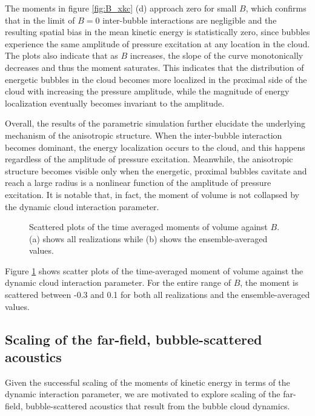 \documentclass{jfm}
\begin{document}
The moments in figure \ref{fig:B_xkc} (d) approach zero for small $B$, which confirms that in the limit of $B=0$ inter-bubble interactions are negligible and the resulting spatial bias in the mean kinetic energy is statistically zero, since bubbles experience the same amplitude of pressure excitation at any location in the cloud.
The plots also indicate that as $B$ increases, the slope of the curve monotonically decreases and thus the moment saturates. 
This indicates that the distribution of energetic bubbles in the cloud becomes more localized in the proximal side of the cloud with increasing the pressure amplitude, while the magnitude of energy localization eventually becomes invariant to the amplitude.

Overall, the results of the parametric simulation further elucidate the underlying mechanism of the anisotropic structure.
When the inter-bubble interaction becomes dominant, the energy localization occurs to the cloud, and this happens regardless of the amplitude of pressure excitation. Meanwhile, the anisotropic structure becomes visible only when the energetic, proximal bubbles cavitate and reach a large radius is a nonlinear function of the amplitude of pressure excitation.
It is notable that, in fact, the moment of volume is not collapsed by the dynamic cloud interaction parameter.
\begin{figure}
  \center
  \caption{Scattered plots of the time averaged moments of volume against $B$. (a) shows all realizations while (b) shows the ensemble-averaged values.
   }
   \label{fig:B_xvc}
\end{figure}
Figure \ref{fig:B_xvc} shows scatter plots of the time-averaged moment of volume against the dynamic cloud interaction parameter. For the entire range of $B$, the moment is scattered between -0.3 and 0.1 for both all realizations and the ensemble-averaged values.

\subsection{Scaling of the far-field, bubble-scattered acoustics}
\label{section:acoustics}
Given the successful scaling of the moments of kinetic energy in terms of the dynamic interaction parameter, we are motivated to explore scaling of the far-field, bubble-scattered acoustics that result from the bubble cloud dynamics.
\end{document}

